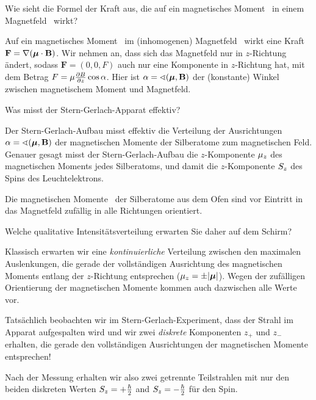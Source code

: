 \begin{frage}
 Wie sieht die Formel der Kraft aus, die auf ein magnetisches Moment \magnmom\ in einem Magnetfeld \magnf\ wirkt?
\end{frage}
\begin{antw}
 Auf ein magnetisches Moment \magnmom\  im (inhomogenen) Magnetfeld \magnf\ wirkt eine Kraft $\mathbf{F} = \nabla (\boldsymbol{\mu} \cdot \mathbf{B})$. Wir nehmen an, dass sich das Magnetfeld nur in $z$-Richtung \"andert, sodass $\mathbf{F} = (0,0,F)$ auch nur eine Komponente in $z$-Richtung hat, mit dem Betrag $F= \mu \frac{\partial B}{\partial z} \cos \alpha$. Hier ist $\alpha = \sphericalangle(\boldsymbol{\mu}, \mathbf{B})$ der (konstante) Winkel zwischen magnetischem Moment und Magnetfeld.
\end{antw}

\begin{frage}
 Was misst der Stern-Gerlach-Apparat effektiv?
\end{frage}
\begin{antw}
 Der Stern-Gerlach-Aufbau misst effektiv die Verteilung der Ausrichtungen $\alpha = \sphericalangle(\boldsymbol{\mu}, \mathbf{B})$ der magnetischen Momente der Silberatome zum magnetischen Feld. Genauer gesagt misst der Stern-Gerlach-Aufbau die $z$-Komponente $\mu_z$ des magnetischen Moments jedes Silberatoms, und damit die $z$-Komponente $S_z$ des Spins des Leuchtelektrons.
\end{antw}


Die magnetischen Momente \magnmom\ der Silberatome aus dem Ofen sind vor Eintritt in das Magnetfeld zuf\"allig in alle Richtungen orientiert.

\begin{frage}
 Welche qualitative Intensit\"atsverteilung erwarten Sie daher auf dem Schirm?
\end{frage}
\begin{antw}
 Klassisch erwarten wir eine \emph{kontinuierliche} Verteilung zwischen den maximalen Auslenkungen, die gerade der vollst\"andigen Ausrichtung des magnetischen Moments entlang der $z$-Richtung entsprechen ($\mu_z = \pm |\boldsymbol{\mu}|$). Wegen der zuf\"alligen Orientierung der magnetischen Momente kommen auch dazwischen alle Werte vor.
\end{antw}

\begin{erg}
 Tats\"achlich beobachten wir im Stern-Gerlach-Experiment, dass der Strahl im Apparat aufgespalten wird und wir zwei \emph{diskrete} Komponenten $z_+$ und $z_-$ erhalten, die gerade den vollst\"andigen Ausrichtungen der magnetischen Momente entsprechen!

Nach der Messung erhalten wir also zwei getrennte Teilstrahlen mit nur den beiden diskreten Werten $S_z = +\frac{\hbar}{2}$ and $S_z = -\frac{\hbar}{2}$ f\"ur den Spin.
\end{erg}


